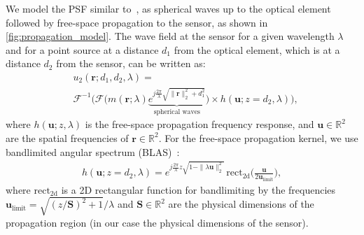 \noindent We model the PSF similar to~\cite{sitzmann2018e2e}, \ie as spherical waves up to the optical element followed by free-space propagation to the sensor, as shown in \cref{fig:propagation_model}.
The wave field at the sensor for a given wavelength $\lambda$ and for a point source at a distance $d_1$ from the optical element, which is at a distance $d_2$ from the sensor, can be written as:
\begin{align}
	\label{eq:wavefield_app}
	&u_2(\bm{r}; d_1, d_2, \lambda) = \nonumber \\ 
	&\mathcal{F}^{-1}\Big(\mathcal{F} \Big( m(\bm{r}; \lambda) \underbrace{e^{j \frac{2\pi}{\lambda} \sqrt{\|\bm{r}\|_2^2 +  d_1^2}}}_{\text{spherical waves}}
	\Big) \times h(\bm{u}; z=d_2, \lambda) \Big),
\end{align}
where 
$ h(\bm{u}; z, \lambda)$ is the free-space propagation frequency response, and
$\bm{u} \in \mathbb{R}^2$ are the spatial frequencies of $\bm{r} \in \mathbb{R}^2$.
For the free-space propagation kernel, we use bandlimited angular spectrum (BLAS)~\cite{Matsushima2009}:
\begin{align}
	\label{eq:freespace}
	h(\bm{u}; z=d_2, \lambda ) = e^ {j \frac{2 \pi}{\lambda} z \sqrt{1 - \|\lambda \bm{u}\|_2^2} } \,\text{rect}_{\text{2d}}\Big(\frac{\bm{u}}{2\bm{u}_{\text{limit}}}\Big),
\end{align}
where $ \text{rect}_{\text{2d}} $ is a 2D rectangular function for bandlimiting by the frequencies $\bm{u}_{\text{limit}} = \sqrt{(z / \bm{S} )^2  + 1} / \lambda$
and $ \bm{S} \in \mathbb{R}^2 $ are the physical dimensions of the propagation region (in our case the physical dimensions of the sensor).



